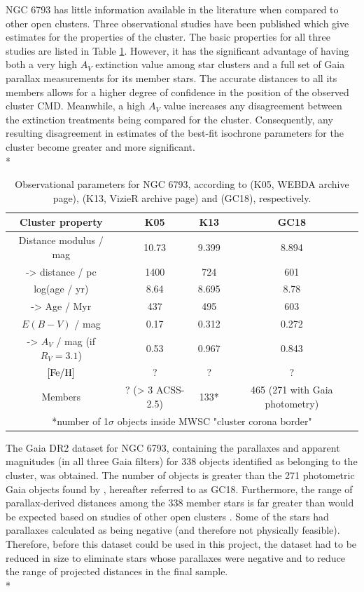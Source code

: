 \documentclass[12pt, a4paper]{report}
\begin{document}
NGC 6793 has little information available in the literature when compared to other open clusters. Three observational studies have been published which give estimates for the properties of the cluster. The basic properties for all three studies are listed in Table \ref{NGC6793_obs}. However, it has the significant advantage of having both a very high $A_{V}$ extinction value among star clusters and a full set of Gaia parallax measurements for its member stars. The accurate distances to all its members allows for a higher degree of confidence in the position of the observed cluster CMD. Meanwhile, a high $A_{V}$ value increases any disagreement between the extinction treatments being compared for the cluster. Consequently, any resulting disagreement in estimates of the best-fit isochrone parameters for the cluster become greater and more significant. \\*

\begin{table}
\begin{center}
\begin{tabular}{cccc}
\hline
Cluster property & K05 & K13 & GC18 \\
\hline
Distance modulus / mag & 10.73 & 9.399 & 8.894 \\
-> distance / pc & 1400 & 724 & 601 \\
log(age / yr) & 8.64 & 8.695 & 8.78 \\
-> Age / Myr & 437 & 495 & 603 \\
$E(B-V)$ / mag & 0.17 & 0.312 & 0.272 \\
-> $A_{V}$ / mag (if $R_{V} = 3.1$) & 0.53 & 0.967 & 0.843 \\
$\textnormal{[Fe/H]}$ & ? & ? & ? \\
Members & ? (> 3 ACSS-2.5) & 133* & 465 (271 with Gaia photometry) \\
\hline
\multicolumn{4}{c}{*number of 1$\sigma$ objects inside MWSC "cluster corona border"} \\
\end{tabular}
\caption{Observational parameters for NGC 6793, according to \cite{2005A&A...438.1163K} (K05, WEBDA archive page), \cite{2013A&A...558A..53K} (K13, VizieR archive page) and \cite{2018A&A...616A..10G} (GC18), respectively.}
\label{NGC6793_obs}
\end{center}
\end{table}


The Gaia DR2 dataset for NGC 6793, containing the parallaxes and apparent magnitudes (in all three Gaia filters) for 338 objects identified as belonging to the cluster, was obtained. The number of objects is greater than the 271 photometric Gaia objects found by \cite{2018A&A...616A..10G}, hereafter referred to as GC18. Furthermore, the range of parallax-derived distances among the 338 member stars is far greater than would be expected based on studies of other open clusters \citep{2006A&A...456..523S}. Some of the stars had parallaxes calculated as being negative (and therefore not physically feasible). Therefore, before this dataset could be used in this project, the dataset had to be reduced in size to eliminate stars whose parallaxes were negative and to reduce the range of projected distances in the final sample. \\*
\end{document}
